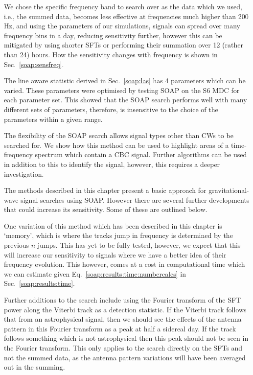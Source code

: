 We chose the specific frequency band to search over as the data which we used, i.e., the summed data, becomes less effective at frequencies much higher than 200\,Hz, and using the parameters of our simulations, signals can spread over many frequency bins in a day, reducing sensitivity further, however this can be mitigated by using shorter \glspl{SFT} or performing their summation over 12 (rather than 24) hours.
How the sensitivity changes with frequency is shown in Sec.~\ref{soap:sensfreq}. 

The line aware statistic derived in Sec.~\ref{soap:las} has 4 parameters which can be varied. 
These parameters were optimised by testing SOAP on the S6 \gls{MDC} for each parameter set. 
This showed that the SOAP search performs well with many different sets of parameters, therefore, is insensitive to the choice of the parameters within a given range. 

The flexibility of the SOAP search allows signal types other than \glspl{CW} to be searched for. We show how this method can be used to highlight areas of a time-frequency spectrum which contain a \gls{CBC} signal. 
Further algorithms can be used in addition to this to identify the signal, however, this requires a deeper investigation.

%
%
The methods described in this chapter present a basic approach for gravitational-wave signal searches using SOAP. However there are several further developments that could increase its sensitivity. Some of these are outlined below.

One variation of this method which has been described in this chapter is `memory', which is where the tracks jump in frequency is determined by the previous $n$ jumps. This has yet to be fully tested, however, we expect that this will increase our sensitivity to signals where we have a better idea of their frequency evolution. This however, comes at a cost in computational time which we can estimate given Eq.~\ref{soap:results:time:numbercalcs} in Sec.~\ref{soap:results:time}.

Further additions to the search include using the Fourier transform of the \gls{SFT} power along the Viterbi track as a detection statistic.
If the Viterbi track follows that from an astrophysical signal, then we should see the effects of the antenna pattern in this Fourier transform as a peak at half a sidereal day.
If the track follows something which is not astrophysical then this peak should not be seen in the Fourier transform.
This only applies to the search directly on the \glspl{SFT} and not the summed data, as the antenna pattern variations will have been averaged out in the summing.

